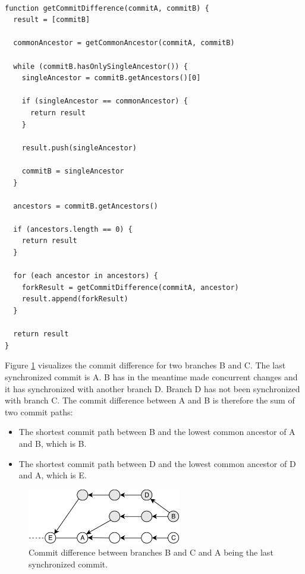 \begin{lstlisting}[caption=Detecting commit history difference, label=commit-difference]

function getCommitDifference(commitA, commitB) {
  result = [commitB]

  commonAncestor = getCommonAncestor(commitA, commitB)

  while (commitB.hasOnlySingleAncestor()) {
    singleAncestor = commitB.getAncestors()[0]

    if (singleAncestor == commonAncestor) {
      return result
    }

    result.push(singleAncestor)

    commitB = singleAncestor
  }

  ancestors = commitB.getAncestors()

  if (ancestors.length == 0) {
    return result
  }

  for (each ancestor in ancestors) {
    forkResult = getCommitDifference(commitA, ancestor)
    result.append(forkResult)
  }

  return result
}

\end{lstlisting}

Figure \ref{fig:histo.new-commits} visualizes the commit difference for two branches B and C.
The last synchronized commit is A.
B has in the meantime made concurrent changes and it has synchronized with another branch D.
Branch D has not been synchronized with branch C.
The commit difference between A and B is therefore the sum of two commit paths:\\

\begin{itemize}
\item The shortest commit path between B and the lowest common ancestor of A and B, which is B.
\item The shortest commit path between D and the lowest common ancestor of D and A, which is E.
\end{itemize}

\begin{figure}[new-commits]
  \centering
  \includegraphics[width=0.6\textwidth]{img/new-commits}
  \caption{Commit difference between branches B and C and A being the last synchronized commit.}
  \label{fig:histo.new-commits}
\end{figure}

